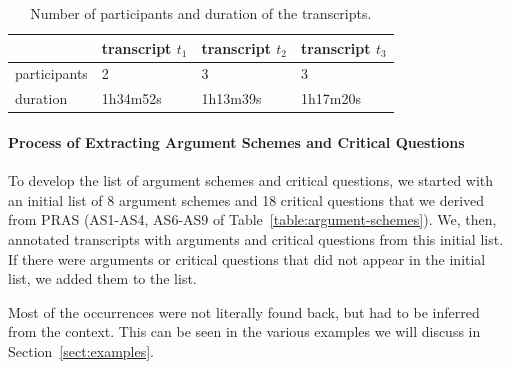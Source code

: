 \begin{table}[ht]
\centering
\begin{tabular}{|l|l|l|l|}
\hline
& transcript $t_1$ & transcript $t_2$ & transcript $t_3$\\
\hline
participants & 2 & 3 & 3\\
\hline
duration & 1h34m52s & 1h13m39s & 1h17m20s\\
\hline
\end{tabular}
\caption{Number of participants and duration of the transcripts.}
\label{table:transcripts:info}
\end{table}

\paragraph{Process of Extracting Argument Schemes and Critical Questions} 

To develop the list of argument schemes and critical questions, we started with an initial list of 8 argument schemes and 18 critical questions that we derived from PRAS (AS1-AS4, AS6-AS9 of Table~\ref{table:argument-schemes}). We, then, annotated transcripts with arguments and critical questions from this initial list. If there were arguments or critical questions that did not appear in the initial list, we added them to the list.

Most of the occurrences were not literally found back, but had to be inferred from the context. This can be seen in the various examples we will discuss in Section~\ref{sect:examples}.


